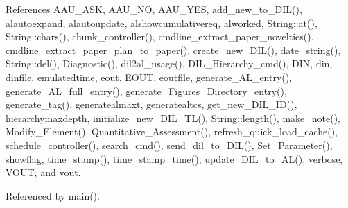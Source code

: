 References AAU\_\-ASK, AAU\_\-NO, AAU\_\-YES, add\_\-new\_\-to\_\-DIL(), alautoexpand, alautoupdate, alshowcumulativereq, alworked, String::at(), String::chars(), chunk\_\-controller(), cmdline\_\-extract\_\-paper\_\-novelties(), cmdline\_\-extract\_\-paper\_\-plan\_\-to\_\-paper(), create\_\-new\_\-DIL(), date\_\-string(), String::del(), Diagnostic(), dil2al\_\-usage(), DIL\_\-Hierarchy\_\-cmd(), DIN, din, dinfile, emulatedtime, eout, EOUT, eoutfile, generate\_\-AL\_\-entry(), generate\_\-AL\_\-full\_\-entry(), generate\_\-Figures\_\-Directory\_\-entry(), generate\_\-tag(), generatealmaxt, generatealtcs, get\_\-new\_\-DIL\_\-ID(), hierarchymaxdepth, initialize\_\-new\_\-DIL\_\-TL(), String::length(), make\_\-note(), Modify\_\-Element(), Quantitative\_\-Assessment(), refresh\_\-quick\_\-load\_\-cache(), schedule\_\-controller(), search\_\-cmd(), send\_\-dil\_\-to\_\-DIL(), Set\_\-Parameter(), showflag, time\_\-stamp(), time\_\-stamp\_\-time(), update\_\-DIL\_\-to\_\-AL(), verbose, VOUT, and vout.

Referenced by main().



